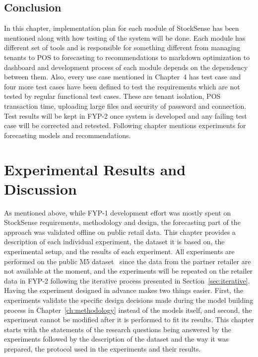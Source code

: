 \documentclass{StockSense}
\begin{document}
\FloatBarrier
\section{Conclusion}

In this chapter, implementation plan for each module of StockSense has been mentioned along with how testing of the system will be done. Each module has different set of tools and is responsible for something different from managing tenants to POS to forecasting to recommendations to markdown optimization to dashboard and development process of each module depends on the dependency between them. Also, every use case mentioned in Chapter~4 has test case and four more test cases have been defined to test the requirements which are not tested by regular functional test cases. These are tenant isolation, POS transaction time, uploading large files and security of password and connection. Test results will be kept in FYP-2 once system is developed and any failing test case will be corrected and retested. Following chapter mentions experiments for forecasting models and recommendations.


\chapter{Experimental Results and Discussion}
\label{ch:results}

As mentioned above, while FYP-1 development effort was mostly spent on StockSense requirements, methodology and design, the forecasting part of the approach was validated offline on public retail data. This chapter provides a description of each individual experiment, the dataset it is based on, the experimental setup, and the results of each experiment. All experiments are performed on the public M5 dataset~\cite{makridakis2022m5} since the data from the partner retailer are not available at the moment, and the experiments will be repeated on the retailer data in FYP-2 following the iterative process presented in Section~\ref{sec:iterative}. Having the experiment designed in advance makes two things easier. First, the experiments validate the specific design decisions made during the model building process in Chapter~\ref{ch:methodology} instead of the models itself, and second, the experiment cannot be modified after it is performed to fit its results. This chapter starts with the statements of the research questions being answered by the experiments followed by the description of the dataset and the way it was prepared, the protocol used in the experiments and their results.
\end{document}
